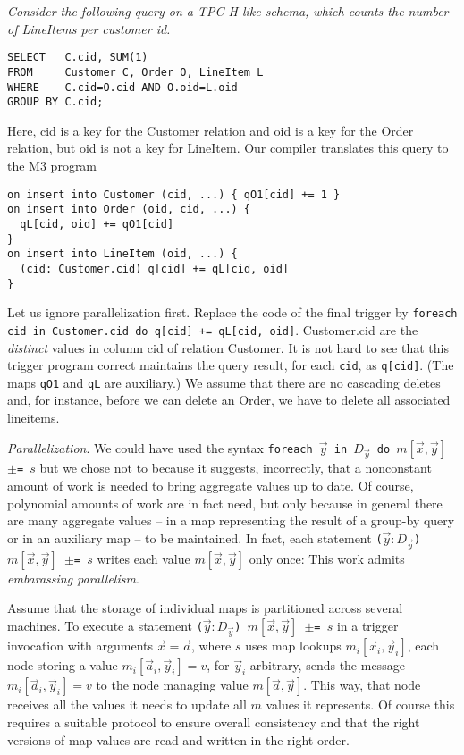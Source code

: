 \begin{example}\em
\label{ex:TPCH-Q12}
Consider the following query on a TPC-H like schema,
which counts the number of LineItems per customer id.
\begin{verbatim}
SELECT   C.cid, SUM(1)
FROM     Customer C, Order O, LineItem L
WHERE    C.cid=O.cid AND O.oid=L.oid
GROUP BY C.cid;
\end{verbatim}
Here, cid is a key for the Customer relation and oid is a key for the
Order relation, but oid is not a key for LineItem.
Our compiler translates this query to the M3 program
\begin{verbatim}
on insert into Customer (cid, ...) { qO1[cid] += 1 }
on insert into Order (oid, cid, ...) {
  qL[cid, oid] += qO1[cid]
}
on insert into LineItem (oid, ...) {
  (cid: Customer.cid) q[cid] += qL[cid, oid]
}
\end{verbatim}

Let us ignore parallelization first.
Replace the code of the final trigger by
{\tt foreach cid in Customer.cid do q[cid] += qL[cid, oid]}.
Customer.cid are the {\em distinct} values in column cid of relation Customer.
It is not hard to see that this trigger program correct maintains the
query result, for each {\tt cid}, as {\tt q[cid]}.
(The maps {\tt qO1} and {\tt qL} are auxiliary.)
We assume that
there are no cascading deletes and, for instance, before we can delete an
Order, we have to delete all associated lineitems.
\punto
\end{example}


{\em Parallelization}.
We could have used the syntax {\tt foreach $\vec{y}$ in $D_{\vec{y}}$ do
$m[\vec{x}, \vec{y}]$ $\pm$= $s$} but we chose not to because it suggests,
incorrectly, that a nonconstant amount of work is needed to bring aggregate
values up to date. Of course, polynomial amounts of work are in fact need,
but only because in general there are many aggregate values -- in a
map representing the result of a group-by query or in an auxiliary map --
to be maintained. In fact, each statement
{\tt ($\vec{y}: D_{\vec{y}}$) $m[\vec{x}, \vec{y}]$ $\pm$= $s$}
writes each value $m[\vec{x}, \vec{y}]$ only once: This work admits
{\em embarassing parallelism}.

Assume that the storage of individual maps
is partitioned across several machines. To execute a statement
{\tt ($\vec{y}: D_{\vec{y}}$) $m[\vec{x}, \vec{y}]$ $\pm$= $s$}
in a trigger invocation with arguments $\vec{x} = \vec{a}$,
where $s$ uses map lookups $m_i[\vec{x}_i, \vec{y}_i]$,
each node storing a value $m_i[\vec{a}_i, \vec{y}_i] = v$,
for $\vec{y}_i$ arbitrary, sends the message
$m_i[\vec{a}_i, \vec{y}_i] = v$ to the node managing value
$m[\vec{a}, \vec{y}]$. This way, that node receives all the values it
needs to update all $m$ values it represents.
Of course this requires a suitable protocol to ensure overall consistency
and that the right versions of map values are read and written in the right
order.



